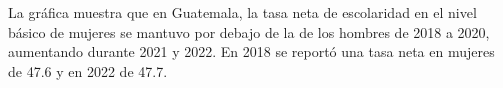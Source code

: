 La gráfica muestra que en Guatemala, la tasa neta de escolaridad en el nivel básico de
mujeres se mantuvo por debajo de la de los hombres de 2018 a 2020, aumentando durante 2021 y 2022. En 2018 se reportó una tasa neta en mujeres de 47.6 y en 2022 de 47.7.